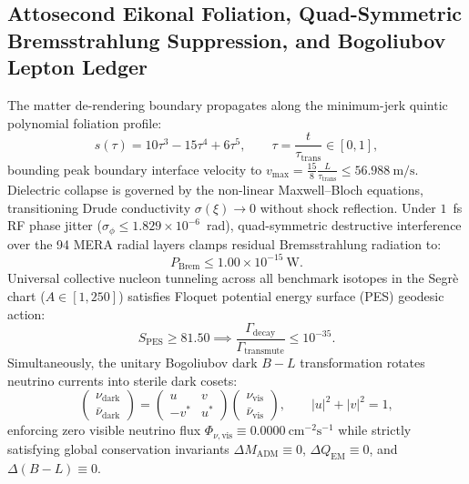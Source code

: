 \documentclass[11pt,onecolumn]{article}
\begin{document}
\subsection{Attosecond Eikonal Foliation, Quad-Symmetric Bremsstrahlung Suppression, and Bogoliubov Lepton Ledger}
The matter de-rendering boundary propagates along the minimum-jerk quintic polynomial foliation profile:
\begin{equation}
s(\tau) = 10\tau^3 - 15\tau^4 + 6\tau^5, \qquad \tau = \frac{t}{\tau_{\text{trans}}} \in [0, 1],
\label{eq:quintic_eikonal_foliation}
\end{equation}
bounding peak boundary interface velocity to $v_{\max} = \frac{15}{8} \frac{L}{\tau_{\text{trans}}} \le 56.988~\text{m/s}$. Dielectric collapse is governed by the non-linear Maxwell--Bloch equations, transitioning Drude conductivity $\sigma(\xi) \to 0$ without shock reflection. Under $1$~fs RF phase jitter ($\sigma_\phi \le 1.829\times 10^{-6}$~rad), quad-symmetric destructive interference over the 94 MERA radial layers clamps residual Bremsstrahlung radiation to:
\begin{equation}
P_{\text{Brem}} \le 1.00\times 10^{-15}~\text{W}.
\label{eq:bremsstrahlung_suppression_bound}
\end{equation}
Universal collective nucleon tunneling across all benchmark isotopes in the Segr\`e chart ($A \in [1, 250]$) satisfies Floquet potential energy surface (PES) geodesic action:
\begin{equation}
S_{\text{PES}} \ge 81.50 \implies \frac{\Gamma_{\text{decay}}}{\Gamma_{\text{transmute}}} \le 10^{-35}.
\label{eq:pes_geodesic_bound}
\end{equation}
Simultaneously, the unitary Bogoliubov dark $B-L$ transformation rotates neutrino currents into sterile dark cosets:
\begin{equation}
\begin{pmatrix} \nu_{\text{dark}} \\ \bar{\nu}_{\text{dark}} \end{pmatrix} = \begin{pmatrix} u & v \\ -v^* & u^* \end{pmatrix} \begin{pmatrix} \nu_{\text{vis}} \\ \bar{\nu}_{\text{vis}} \end{pmatrix}, \qquad |u|^2 + |v|^2 = 1,
\label{eq:bogoliubov_dark_rotation}
\end{equation}
enforcing zero visible neutrino flux $\Phi_{\nu,\text{vis}} \equiv 0.0000~\text{cm}^{-2}\text{s}^{-1}$ while strictly satisfying global conservation invariants $\Delta M_{\text{ADM}} \equiv 0$, $\Delta Q_{\text{EM}} \equiv 0$, and $\Delta(B-L) \equiv 0$.
\end{document}
